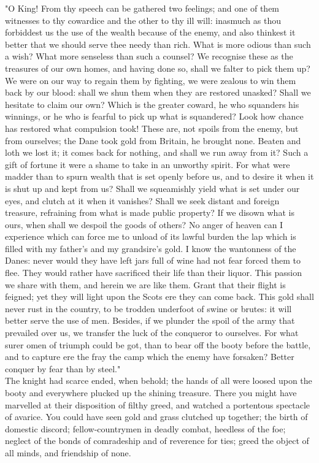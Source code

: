 \documentclass[10pt,a4paper]{report}
\begin{document}
"O King! From thy speech can be gathered two feelings; and one of them witnesses to thy cowardice and the other to thy ill will: inasmuch as thou forbiddest us the use of the wealth because of the enemy, and also thinkest it better that we should serve thee needy than rich. What is more odious than such a wish? What more senseless than such a counsel? We recognise these as the treasures of our own homes, and having done so, shall we falter to pick them up? We were on our way to regain them by fighting, we were zealous to win them back by our blood: shall we shun them when they are restored unasked? Shall we hesitate to claim our own? Which is the greater coward, he who squanders his winnings, or he who is fearful to pick up what is squandered? Look how chance has restored what compulsion took! These are, not spoils from the enemy, but from ourselves; the Dane took gold from Britain, he brought none. Beaten and loth we lost it; it comes back for nothing, and shall we run away from it? Such a gift of fortune it were a shame to take in an unworthy spirit. For what were madder than to spurn wealth that is set openly before us, and to desire it when it is shut up and kept from us? Shall we squeamishly yield what is set under our eyes, and clutch at it when it vanishes? Shall we seek distant and foreign treasure, refraining from what is made public property? If we disown what is ours, when shall we despoil the goods of others? No anger of heaven can I experience which can force me to unload of its lawful burden the lap which is filled with my father's and my grandsire's gold. I know the wantonness of the Danes: never would they have left jars full of wine had not fear forced them to flee. They would rather have sacrificed their life than their liquor. This passion we share with them, and herein we are like them. Grant that their flight is feigned; yet they will light upon the Scots ere they can come back. This gold shall never rust in the country, to be trodden underfoot of swine or brutes: it will better serve the use of men. Besides, if we plunder the spoil of the army that prevailed over us, we transfer the luck of the conqueror to ourselves. For what surer omen of triumph could be got, than to bear off the booty before the battle, and to capture ere the fray the camp which the enemy have forsaken? Better conquer by fear than by steel."\\

The knight had scarce ended, when behold; the hands of all were loosed upon the booty and everywhere plucked up the shining treasure. There you might have marvelled at their disposition of filthy greed, and watched a portentous spectacle of avarice. You could have seen gold and grass clutched up together; the birth of domestic discord; fellow-countrymen in deadly combat, heedless of the foe; neglect of the bonds of comradeship and of reverence for ties; greed the object of all minds, and friendship of none.\\
\end{document}
